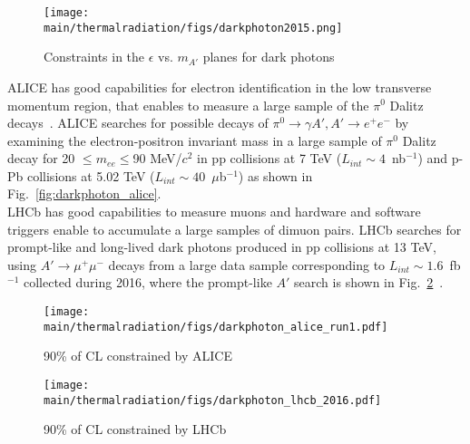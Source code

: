 \documentclass[../report.tex]{subfiles}
\providecommand{\main}{..}
\begin{document}
\begin{figure}[htb]
\centering
\texttt{[image: \\main/thermalradiation/figs/darkphoton2015.png]}
\caption{Constraints in the $\epsilon$ vs. $m_{A'}$ planes for dark photons}
\label{fig:darkphoton2016}
\end{figure}

ALICE has good capabilities for electron identification in the low 
transverse momentum region, that enables to measure a large sample of 
the $\pi^0$ Dalitz decays~\cite{Acharya:2018ohw}. 
ALICE searches for possible decays of 
$\pi^0 \rightarrow \gamma A', A' \rightarrow e^+e^-$ 
by examining the electron-positron invariant mass in a large sample
of $\pi^0$ Dalitz decay for 20 $\le m_{ee} \le $90 MeV/$c^2$ in 
pp collisions at 7 TeV ($L_{int} \sim 4$~nb$^{-1}$) and 
p-Pb collisions at 5.02 TeV ($L_{int} \sim 40$~$\mu$b$^{-1}$) as shown in 
Fig.~\ref{fig:darkphoton_alice}.\\
LHCb has good capabilities to measure muons and hardware and software 
triggers enable to accumulate a large samples of dimuon pairs. 
LHCb searches for prompt-like and long-lived dark photons 
produced in pp collisions at 13 TeV, using $A' \rightarrow \mu^+\mu^-$ decays 
from a large data sample corresponding to $L_{int} \sim 1.6$~fb$^{-1}$ 
collected during 2016, where 
the prompt-like $A'$ search is shown in Fig.~\ref{fig:darkphoton_lhcb}~\cite{Aaij:2017rft}.

\begin{figure}[htbp]
 \begin{minipage}{0.5\hsize}
  \begin{center}
   \texttt{[image: \\main/thermalradiation/figs/darkphoton\_alice\_run1.pdf]}
  \end{center}
  \caption{90\% of CL constrained by ALICE}
  \label{fig:darkphoton_alice}
 \end{minipage}
 \begin{minipage}{0.5\hsize}
  \begin{center}
   \texttt{[image: \\main/thermalradiation/figs/darkphoton\_lhcb\_2016.pdf]}
  \end{center}
  \caption{90\% of CL constrained by LHCb}
  \label{fig:darkphoton_lhcb}
 \end{minipage}
\end{figure}
\end{document}
